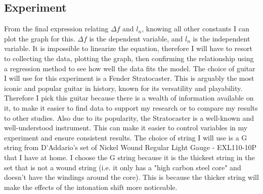 \documentclass[11pt]{article}
\begin{document}
\begin{flushleft}
    \section{Experiment}
        From the final expression relating $\Delta f$ and $l_n$, knowing all other constants I can plot the graph for this. $\Delta f$ is the dependent variable, and $l_n$ is the independent variable. It is impossible to linearize the equation, therefore I will have to resort to collecting the data, plotting the graph, then confirming the relationship using a regression method to see how well the data fits the model. 
        The choice of guitar I will use for this experiment is a Fender Stratocaster. This is arguably the most iconic and popular guitar in history, known for its versatility and playability. Therefore I pick this guitar because there is a wealth of information available on it, to make it easier to find data to support my research or to compare my results to other studies. Also due to its popularity, the Stratocaster is a well-known and well-understood instrument. This can make it easier to control variables in my experiment and ensure consistent results.
        The choice of string I will use is a G string from D'Addario's set of Nickel Wound Regular Light Gauge - EXL110-10P that I have at home. I choose the G string because it is the thickest string in the set that is not a wound string (i.e. it only has a "high carbon steel core" and doesn't have the windings around the core). This is because the thicker string will make the effects of the intonation shift more noticeable. %

\end{flushleft}
\end{document}
